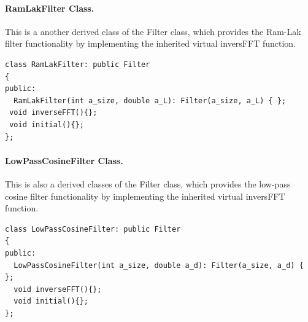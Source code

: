 \paragraph{RamLakFilter Class.}
This is a another derived class of the Filter class, which provides the Ram-Lak filter functionality by implementing the inherited virtual inversFFT function.  
\begin{verbatim}
class RamLakFilter: public Filter
{
public:
  RamLakFilter(int a_size, double a_L): Filter(a_size, a_L) { }; 
 void inverseFFT(){};
 void initial(){};
};
\end{verbatim}

\paragraph{LowPassCosineFilter Class.}
This is also a derived classes of the Filter class, which provides the low-pass cosine filter functionality by implementing the inherited virtual inversFFT function.  
\begin{verbatim}
class LowPassCosineFilter: public Filter
{
public:
  LowPassCosineFilter(int a_size, double a_d): Filter(a_size, a_d) { };
  void inverseFFT(){};
  void initial(){};
};
\end{verbatim}



